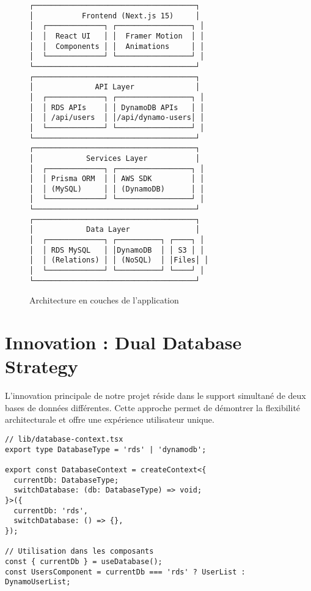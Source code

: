 \documentclass[12pt,a4paper]{report}
\begin{document}
\begin{figure}[H]
\centering
\begin{verbatim}
┌─────────────────────────────────────┐
│           Frontend (Next.js 15)     │
│  ┌─────────────┐ ┌─────────────────┐ │
│  │  React UI   │ │  Framer Motion  │ │
│  │  Components │ │  Animations     │ │
│  └─────────────┘ └─────────────────┘ │
└─────────────────────────────────────┘
┌─────────────────────────────────────┐
│              API Layer              │
│  ┌─────────────┐ ┌─────────────────┐ │
│  │ RDS APIs    │ │ DynamoDB APIs   │ │
│  │ /api/users  │ │/api/dynamo-users│ │
│  └─────────────┘ └─────────────────┘ │
└─────────────────────────────────────┘
┌─────────────────────────────────────┐
│            Services Layer           │
│  ┌─────────────┐ ┌─────────────────┐ │
│  │ Prisma ORM  │ │ AWS SDK         │ │
│  │ (MySQL)     │ │ (DynamoDB)      │ │
│  └─────────────┘ └─────────────────┘ │
└─────────────────────────────────────┘
┌─────────────────────────────────────┐
│            Data Layer               │
│  ┌─────────────┐ ┌──────────┐ ┌────┐ │
│  │ RDS MySQL   │ │DynamoDB  │ │ S3 │ │
│  │ (Relations) │ │ (NoSQL)  │ │Files│ │
│  └─────────────┘ └──────────┘ └────┘ │
└─────────────────────────────────────┘
\end{verbatim}
\caption{Architecture en couches de l'application}
\end{figure}

\section{Innovation : Dual Database Strategy}

L'innovation principale de notre projet réside dans le support simultané de deux bases de données différentes. Cette approche permet de démontrer la flexibilité architecturale et offre une expérience utilisateur unique.

\begin{lstlisting}[caption=Contexte de base de données avec TypeScript]
// lib/database-context.tsx
export type DatabaseType = 'rds' | 'dynamodb';

export const DatabaseContext = createContext<{
  currentDb: DatabaseType;
  switchDatabase: (db: DatabaseType) => void;
}>({
  currentDb: 'rds',
  switchDatabase: () => {},
});

// Utilisation dans les composants
const { currentDb } = useDatabase();
const UsersComponent = currentDb === 'rds' ? UserList : DynamoUserList;
\end{lstlisting}
\end{document}
